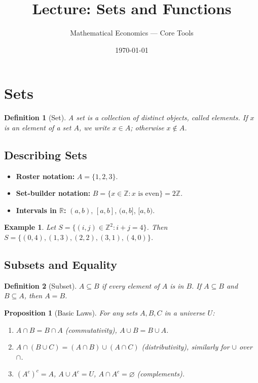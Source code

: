 \documentclass[11pt]{article}
\title{Lecture: Sets and Functions}
\author{\vspace{-0.5em}Mathematical Economics — Core Tools}
\date{\vspace{-0.5em}\today}
\newtheorem{definition}{Definition}
\newtheorem{proposition}{Proposition}
\newtheorem{example}{Example}
\newcommand{\Z}{\mathbb{Z}}
\newcommand{\R}{\mathbb{R}}
\begin{document}
\maketitle
\tableofcontents
\bigskip

\section{Sets}
\begin{definition}[Set]
A \emph{set} is a collection of distinct objects, called elements. If $x$ is an element of a set $A$, we write $x\in A$; otherwise $x\notin A$.
\end{definition}

\subsection{Describing Sets}
\begin{itemize}[leftmargin=*]
  \item \textbf{Roster notation:} $A=\{1,2,3\}$. 
  \item \textbf{Set-builder notation:} $B=\{x\in \Z: x\text{ is even}\} = 2\Z$. 
  \item \textbf{Intervals in $\R$:} $(a,b)$, $[a,b]$, $(a,b]$, $[a,b)$.
\end{itemize}

\begin{example}
Let $S=\{(i,j)\in\Z^2: i+j=4\}$. Then $S=\{(0,4),(1,3),(2,2),(3,1),(4,0)\}$.
\end{example}

\subsection{Subsets and Equality}
\begin{definition}[Subset]
$A\subseteq B$ if every element of $A$ is in $B$. If $A\subseteq B$ and $B\subseteq A$, then $A=B$.
\end{definition}

\begin{proposition}[Basic Laws]
For any sets $A,B,C$ in a universe $U$:
\begin{enumerate}[label=\arabic*.]
  \item $A\cap B=B\cap A$ (commutativity),\; $A\cup B=B\cup A$.
  \item $A\cap (B\cup C)=(A\cap B)\cup(A\cap C)$ (distributivity), similarly for $\cup$ over $\cap$.
  \item $(A^c)^c=A$,\; $A\cup A^c=U$,\; $A\cap A^c=\varnothing$ (complements).
\end{enumerate}
\end{proposition}
\end{document}
